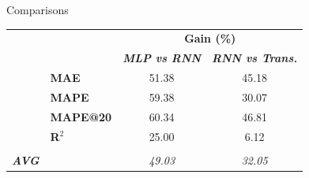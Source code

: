 \begin{frame}{Comparisons}
       \centering
       \begin{tabular}{cl|c|c}
           &\multicolumn{1}{c}{} & \multicolumn{2}{c}{\textbf{Gain (\%)}} \\
           & &\textbf{\textit{ MLP vs RNN}} & \textbf{\textit{RNN vs Trans.}}\\
            \cline{2-4}
           &\textbf{MAE} & 51.38 & 45.18\\
            \cline{2-4}
          & \textbf{MAPE} & 59.38 &30.07 \\
            \cline{2-4}
          & \textbf{MAPE@20} & 60.34 & 46.81 \\
            \cline{2-4}
          & \textbf{R$^2$} & 25.00 & 6.12\\
          \multicolumn{4}{c}{} \\
          \hline
          \textbf{\textit{AVG}} & & \textit{49.03} & \textit{32.05}
       \end{tabular}
\end{frame}